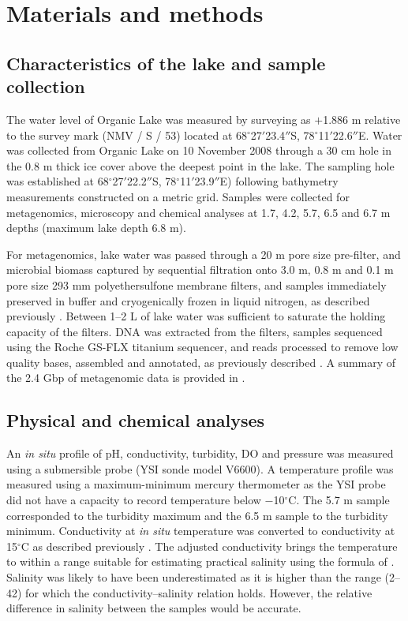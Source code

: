 \section{Materials and methods}
\subsection{Characteristics of the lake and sample collection}
The water level of Organic Lake was measured by surveying as $+$1.886 m relative to the survey mark (NMV / S / 53) located at 68$^{\circ}$27$'$23.4$''$S, 78$^{\circ}$11$'$22.6$''$E.
Water was collected from Organic Lake on 10 November 2008 through a 30 cm hole in the 0.8 m thick ice cover above the deepest point in the lake. 
The sampling hole was established at 68$^{\circ}$27$'$22.2$''$S, 78$^{\circ}$11$'$23.9$''$E) following bathymetry measurements constructed on a metric grid. 
Samples were collected for metagenomics, microscopy and chemical analyses at 1.7, 4.2, 5.7, 6.5 and 6.7 m depths (maximum lake depth 6.8 m).

For metagenomics, lake water was passed through a 20 \textmu{}m pore size pre-filter, and microbial biomass captured by sequential filtration onto 3.0 \textmu{}m, 0.8 \textmu{}m and 0.1 \textmu{}m pore size 293 mm polyethersulfone membrane filters, and samples immediately preserved in buffer and cryogenically frozen in liquid nitrogen, as described previously \cite{Ng2010a, Lauro2011}. 
Between 1--2 L of lake water was sufficient to saturate the holding capacity of the filters. 
\textsc{DNA} was extracted from the filters, samples sequenced using the Roche GS-FLX titanium sequencer, and reads processed to remove low quality bases, assembled and annotated, as previously described \cite{Ng2010a, Lauro2011}. 
A summary of the 2.4 Gbp of metagenomic data is provided in .


\subsection{Physical and chemical analyses}
An \emph{in situ} profile of pH, conductivity, turbidity, \ac{DO} and pressure was measured using a submersible probe (\textsc{YSI} sonde model V6600). 
A temperature profile was measured using a maximum-minimum mercury thermometer as the \textsc{YSI} probe did not have a capacity to record temperature below $-$10$^{\circ}$C. 
The 5.7 m sample corresponded to the turbidity maximum and the 6.5 m sample to the turbidity minimum. 
Conductivity at \emph{in situ} temperature was converted to conductivity at 15$^{\circ}$C as described previously \cite{Gibson1999}. 
The adjusted conductivity brings the temperature to within a range suitable for estimating practical salinity using the formula of \citet{Fofonoff1983}. 
Salinity was likely to have been underestimated as it is higher than the range (2--42) for which the conductivity--salinity relation holds. 
However, the relative difference in salinity between the samples would be accurate. 

